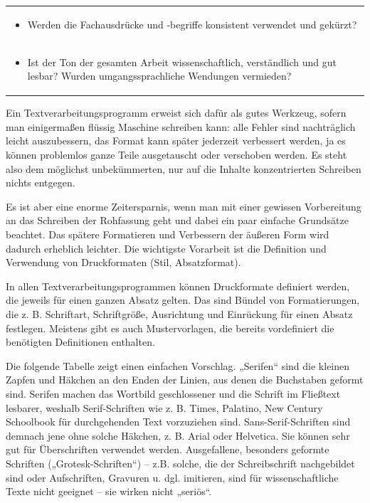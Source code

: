 \documentclass[]{book}
\providecommand{\tightlist}{%
  \setlength{\itemsep}{0pt}\setlength{\parskip}{0pt}}
\theoremstyle{definition}
\theoremstyle{definition}
\theoremstyle{definition}
\theoremstyle{remark}
\begin{document}
\begin{longtable}[]{@{}l@{}}
\begin{minipage}[t]{0.97\columnwidth}\raggedright\strut
\begin{itemize}
\tightlist
\item
  Werden die Fachausdrücke und -begriffe konsistent verwendet und
  gekürzt? \vspace{-6mm}
\end{itemize}\strut
\end{minipage}\tabularnewline
\begin{minipage}[t]{0.97\columnwidth}\raggedright\strut
\begin{itemize}
\tightlist
\item
  Ist der Ton der gesamten Arbeit wissenschaftlich, verständlich und gut
  lesbar? Wurden umgangssprachliche Wendungen vermieden?
\end{itemize}\strut
\end{minipage}\tabularnewline
\bottomrule
\end{longtable}

Ein Textverarbeitungsprogramm erweist sich dafür als gutes Werkzeug,
sofern man einigermaßen flüssig Maschine schreiben kann: alle Fehler
sind nachträglich leicht auszubessern, das Format kann später jederzeit
verbessert werden, ja es können problemlos ganze Teile ausgetauscht oder
verschoben werden. Es steht also dem möglichst unbekümmerten, nur auf
die Inhalte konzentrierten Schreiben nichts entgegen.

Es ist aber eine enorme Zeitersparnis, wenn man mit einer gewissen
Vorbereitung an das Schreiben der Rohfassung geht und dabei ein paar
einfache Grundsätze beachtet. Das spätere Formatieren und Verbessern der
äußeren Form wird dadurch erheblich leichter. Die wichtigste Vorarbeit
ist die Definition und Verwendung von Druckformaten (Stil,
Absatzformat).

In allen Textverarbeitungsprogrammen können Druckformate definiert
werden, die jeweils für einen ganzen Absatz gelten. Das sind Bündel von
Formatierungen, die z. B. Schriftart, Schriftgröße, Ausrichtung und
Einrückung für einen Absatz festlegen. Meistens gibt es auch
Mustervorlagen, die bereits vordefiniert die benötigten Definitionen
enthalten.

Die folgende Tabelle zeigt einen einfachen Vorschlag. „Serifen`` sind
die kleinen Zapfen und Häkchen an den Enden der Linien, aus denen die
Buchstaben geformt sind. Serifen machen das Wortbild geschlossener und
die Schrift im Fließtext lesbarer, weshalb Serif-Schriften wie z. B.
Times, Palatino, New Century Schoolbook für durchgehenden Text
vorzuziehen sind. Sans-Serif-Schriften sind demnach jene ohne solche
Häkchen, z. B. Arial oder Helvetica. Sie können sehr gut für
Überschriften verwendet werden. Ausgefallene, besonders geformte
Schriften („Grotesk-Schriften``) -- z.B. solche, die der Schreibschrift
nachgebildet sind oder Aufschriften, Gravuren u. dgl. imitieren, sind
für wissenschaftliche Texte nicht geeignet -- sie wirken nicht
„seriös``.
\end{document}
